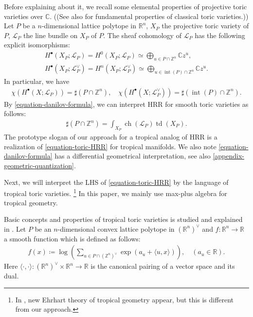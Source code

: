 \documentclass[a4paper,dvipdfmx,reqno,12pt]{amsart}
\theoremstyle{definition}
\newcommand{\deq}{\coloneqq}
\newcommand{\opn}[1]{\operatorname{#1}}
\newcommand{\abk}[1]{\langle {#1} \rangle}%
\newcommand{\myfootnote}[1]{\hspace{-5pt}\footnote{#1}}
\numberwithin{equation}{section}
\begin{document}
Before explaining about it, we recall some 
elemental properties of projective toric varieties over 
$\mathbb{C}$.
((See also \cite{MR2810322} for fundamental
properties of classical toric varieties.))
Let $P$ be a $n$-dimensional lattice polytope in 
$\mathbb{R}^{n}$, $X_P$ the projective toric variety
of $P$, $\mathcal{L}_P$ the line bundle on 
$X_P$ of $P$.
The sheaf cohomology of $\mathcal{L}_P$ has 
the following explicit isomorphisms:
\begin{align}
H^{\bullet}(X_P;\mathcal{L}_P)=
H^{0}(X_P;\mathcal{L}_P)\simeq
\bigoplus_{u\in P\cap \mathbb{Z}^{n}} \mathbb{C}z^{u},
\label{equation-danilov-formula} \\
H^{\bullet}(X_P;\mathcal{L}_P^{\vee})=
H^{n}(X_P;\mathcal{L}_P^{\vee})\simeq 
\bigoplus_{u\in \opn{int}(P)\cap \mathbb{Z}^{n}}\mathbb{C}z^{u}.
\end{align}
In particular, we have
\begin{align} \label{equation-ehrhart-reciprocity}
\chi(H^{\bullet}(X;\mathcal{L}_P))=
\sharp (P\cap \mathbb{Z}^{n}), \quad 
\chi(H^{\bullet}(X;\mathcal{L}_P^{\vee}))=
\sharp (\opn{int}(P)\cap \mathbb{Z}^{n}).
\end{align}
By \cref{equation-danilov-formula}, we can interpret HRR 
for smooth toric varieties 
as follows:
\begin{align}
\label{equation-toric-HRR}
\sharp (P\cap \mathbb{Z}^{n})
=\int_{X_P}\opn{ch}(\mathcal{L}_P)\opn{td}(X_P).
\end{align}
The prototype slogan of our approach
for a tropical analog of HRR is 
a realization of \cref{equation-toric-HRR}
for tropical manifolds.
We also note \cref{equation-danilov-formula} 
has a differential geometrical interpretation,
see also \cref{appendix-geometric-quantization}. 


Next, we will interpret the LHS of 
\cref{equation-toric-HRR} by the language
of tropical toric varieties.
\myfootnote{
In \cite{MR4155409},
new Ehrhart theory of tropical geometry appear, 
but this is different from our approach.
}
In this paper, we mainly use max-plus algebra for 
tropical geometry.


Basic concepts and properties 
of tropical toric varieties is studied and 
explained in \cite{MR2428356,MR2511632,meyer2011intersection,MR3287221}.
Let $P$ be an $n$-dimensional convex lattice polytope in
$(\mathbb{R}^{n})^{\vee}$ and
$f\colon \mathbb{R}^{n} \to \mathbb{R}$ a 
smooth function which is defined as follows:
\begin{align}
  f(x)\deq\log (\sum_{u\in P\cap (\mathbb{Z}^{n})^{\vee}} 
\opn{exp}(a_u+\abk{u,x})),\quad  (a_u\in \mathbb{R}).
\label{equation-log-polynomial} 
\end{align}
Here 
$\abk{\cdot,\cdot}\colon 
(\mathbb{R}^{n})^{\vee}\times \mathbb{R}^{n}\to\mathbb{R}$
is the canonical pairing of a vector space and its dual.
\end{document}
